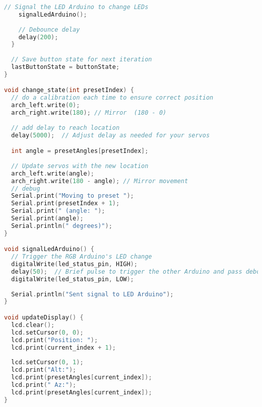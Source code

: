 \begin{lstlisting}[style=cstyle, caption=C++ Code of the ARCH Arduino, label=lst:ArchCode, language=c++ ]
    // Signal the LED Arduino to change LEDs
    signalLedArduino();
    
    // Debounce delay
    delay(200);
  }
  
  // Save button state for next iteration
  lastButtonState = buttonState;
}

void change_state(int presetIndex) {
  // do a calibration each time to ensure correct position
  arch_left.write(0);
  arch_right.write(180); // Mirror  (180 - 0)
  
  // add delay to reach location
  delay(5000);  // Adjust delay as needed for your servos

  int angle = presetAngles[presetIndex];
  
  // Update servos with the new location
  arch_left.write(angle);
  arch_right.write(180 - angle); // Mirror movement
  // debug
  Serial.print("Moving to preset ");
  Serial.print(presetIndex + 1);
  Serial.print(" (angle: ");
  Serial.print(angle);
  Serial.println(" degrees)");
}

void signalLedArduino() {
  // Trigger the RGB Arduino's LED change
  digitalWrite(led_status_pin, HIGH);
  delay(50);  // Brief pulse to trigger the other Arduino and pass debounce check
  digitalWrite(led_status_pin, LOW);
  
  Serial.println("Sent signal to LED Arduino");
}

void updateDisplay() {
  lcd.clear();
  lcd.setCursor(0, 0);
  lcd.print("Position: ");
  lcd.print(current_index + 1);  
  
  lcd.setCursor(0, 1);
  lcd.print("Alt:");
  lcd.print(presetAngles[current_index]);
  lcd.print(" Az:");
  lcd.print(presetAngles[current_index]);
}
\end{lstlisting}
